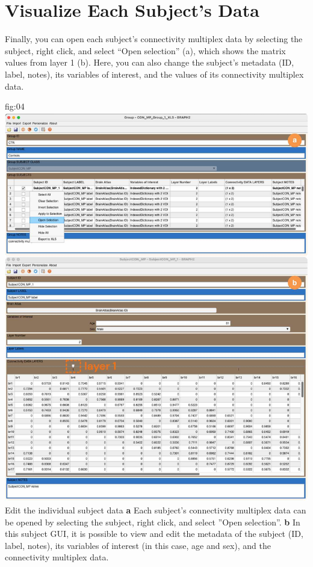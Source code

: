 \documentclass[justified]{tufte-handout}
\begin{document}
\section{Visualize Each Subject's Data}

Finally, you can open each subject's connectivity multiplex data by selecting the subject, right click, and select ``Open selection'' (a), which shows the matrix values from layer 1 (b). Here, you can also change the subject's metadata (ID, label, notes), its variables of interest, and the values of its connectivity multiplex data.

	{fig:04}
	{\includegraphics{fig04.jpg}
	}
	{Edit the individual subject data}
	{
	{\bf a}  Each subject's connectivity multiplex data can be opened by selecting the subject, right click, and select ''Open selection''. 
	{\bf b} In this subject GUI, it is possible to view and edit the metadata of the subject (ID, label, notes), its variables of interest (in this case, age and sex), and the connectivity multiplex data. 
	}
\end{document}
